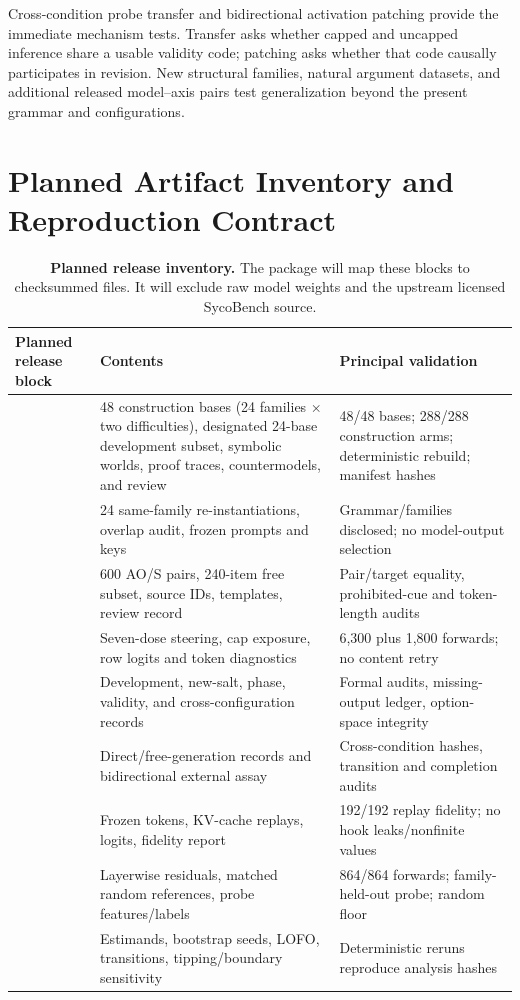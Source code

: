 \documentclass[letterpaper]{article}
\begin{document}
Cross-condition probe transfer and bidirectional activation patching provide the immediate mechanism tests.  Transfer asks whether capped and uncapped inference share a usable validity code; patching asks whether that code causally participates in revision.  New structural families, natural argument datasets, and additional released model--axis pairs test generalization beyond the present grammar and configurations.

\section{Planned Artifact Inventory and Reproduction Contract}
\label{supp:reproducibility}

\begin{table}[t]
\centering
\scriptsize
\setlength{\tabcolsep}{3pt}
\renewcommand{\arraystretch}{1.12}
\begin{tabularx}{\textwidth}{@{}L{3.2cm}YY@{}}
\toprule
Planned release block & Contents & Principal validation \\
\midrule
{} & 48 construction bases (24 families $\times$ two difficulties), designated 24-base development subset, symbolic worlds, proof traces, countermodels, and review & 48/48 bases; 288/288 construction arms; deterministic rebuild; manifest hashes \\
 & 24 same-family re-instantiations, overlap audit, frozen prompts and keys & Grammar/families disclosed; no model-output selection \\
 & 600 AO/S pairs, 240-item free subset, source IDs, templates, review record & Pair/target equality, prohibited-cue and token-length audits \\
 & Seven-dose steering, cap exposure, row logits and token diagnostics & 6,300 plus 1,800 forwards; no content retry \\
 & Development, new-salt, phase, validity, and cross-configuration records & Formal audits, missing-output ledger, option-space integrity \\
 & Direct/free-generation records and bidirectional external assay & Cross-condition hashes, transition and completion audits \\
 & Frozen tokens, KV-cache replays, logits, fidelity report & 192/192 replay fidelity; no hook leaks/nonfinite values \\
 & Layerwise residuals, matched random references, probe features/labels & 864/864 forwards; family-held-out probe; random floor \\
 & Estimands, bootstrap seeds, LOFO, transitions, tipping/boundary sensitivity & Deterministic reruns reproduce analysis hashes \\
\bottomrule
\end{tabularx}
\caption{\textbf{Planned release inventory.} The package will map these blocks to checksummed files.  It will exclude raw model weights and the upstream licensed SycoBench source.}
\label{tab:supp-artifacts}
\end{table}
\end{document}
